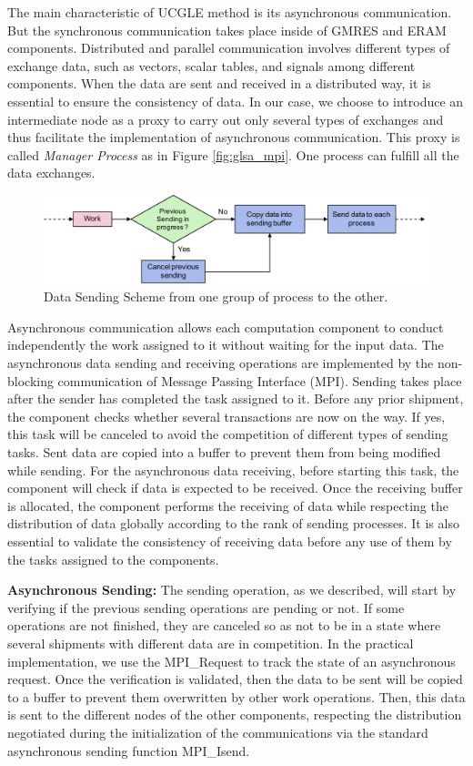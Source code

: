 The main characteristic of UCGLE method is its asynchronous communication. But the synchronous communication takes place inside of GMRES and ERAM components. Distributed and parallel communication involves different types of exchange data, such as vectors, scalar tables, and signals among different components. When the data are sent and received in a distributed way, it is essential to ensure the consistency of data. In our case, we choose to introduce an intermediate node as a proxy to carry out only several types of exchanges and thus facilitate the implementation of asynchronous communication. This proxy is called \textit{Manager Process} as in Figure \ref{fig:glsa_mpi}. One process can fulfill all the data exchanges.

\begin{figure}
	\centering
	\includegraphics[width=6.2in]{fig/send.pdf}
	\caption{Data Sending Scheme from one group of process to the other.}
	\label{fig:send}
\end{figure}

Asynchronous communication allows each computation component to conduct independently the work assigned to it without waiting for the input data. The asynchronous data sending and receiving operations are implemented by the non-blocking communication of Message Passing Interface (MPI). Sending takes place after the sender has completed the task assigned to it. Before any prior shipment, the component checks whether several transactions are now on the way. If yes, this task will be canceled to avoid the competition of different types of sending tasks. Sent data are copied into a buffer to prevent them from being modified while sending. For the asynchronous data receiving, before starting this task, the component will check if data is expected to be received. Once the receiving buffer is allocated, the component performs the receiving of data while respecting the distribution of data globally according to the rank of sending processes. It is also essential to validate the consistency of receiving data before any use of them by the tasks assigned to the components.


\textbf{Asynchronous Sending:} The sending operation, as we described, will start by verifying if the previous sending operations are pending or not. If some operations are not finished, they are canceled so as not to be in a state where several shipments with different data are in competition. In the practical implementation, we use the MPI\_Request to track the state of an asynchronous request. Once the verification is validated, then the data to be sent will be copied to a buffer to prevent them overwritten by other work operations. Then, this data is sent to the different nodes of the other components, respecting the distribution negotiated during the initialization of the communications via the standard asynchronous sending function MPI\_Isend.

